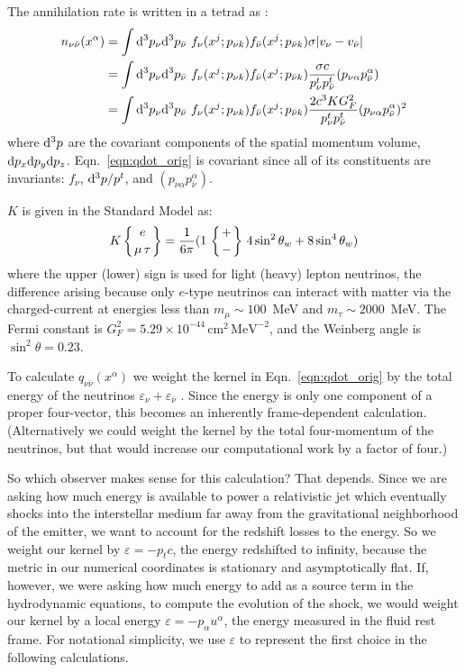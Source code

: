 The annihilation rate is written in a tetrad as \cite{good1987-nunubar}:
\begin{align}
  \label{eqn:qdot_orig}
  n_{\nu \bar{\nu}}(x^\alpha)
  &= \int \mathrm{d}^3p_{\nu} \mathrm{d}^3p_{\bar{\nu}} \,\,
  f_{\nu}(x^j;p_{\nu k})
  f_{\bar{\nu}}(x^j;p_{\bar{\nu} k})
  \sigma |v_\nu-v_{\bar{\nu}}| \nonumber \\
  &= \int \mathrm{d}^3p_\nu \mathrm{d}^3p_{\bar{\nu}} \,\,
  f_{\nu}(x^j;p_{\nu k})
  f_{\bar{\nu}}(x^j;p_{\bar{\nu} k})
  \frac{\sigma c}{p_{\nu}^t p_{\bar{\nu}}^t} (p_{\nu \alpha}  p_{\bar{\nu}}^\alpha) \nonumber \\
  &= \int \mathrm{d}^3p_{\nu} \mathrm{d}^3p_{\bar{\nu}} \,\,
  f_{\nu}(x^j;p_{\nu k})
  f_{\bar{\nu}}(x^j;p_{\bar{\nu} k})
  \frac{2 c^3 K G_F^2}{p_{\nu}^t p_{\bar{\nu}}^t}
  (p_{\nu \alpha} p_{\bar{\nu}}^\alpha)^2
\end{align}
where $\mathrm{d}^3p$ are the covariant components of the spatial momentum volume,
$\mathrm{d} p_x \mathrm{d} p_y \mathrm{d} p_z$.
Eqn.~\ref{eqn:qdot_orig} is covariant since all of its constituents are
invariants: $f_\nu$, $\mathrm{d}^3p/p^t$, and $(p_{\nu \alpha} p_{\bar{\nu}}^\alpha)$.

$K$ is given in the Standard Model as:
\begin{equation}
  K \left\{{e \atop \mu \, \tau}\right\} = \frac{1}{6\pi}
  (1 \, \left\{{+ \atop -}\right\}
  \, 4 \sin^2 \theta_w + 8 \sin^4 \theta_w) \nonumber
\end{equation}
where the upper (lower) sign is used for light (heavy) lepton neutrinos,
the difference arising because only $e$-type neutrinos can interact with
matter via the charged-current at energies less than $m_\mu\sim100$~MeV
and $m_\tau\sim2000$~MeV.
The Fermi constant is $G_F^2 = 5.29 \times 10^{-44}\, \text{cm}^2 \,\text{MeV}^{-2}$,
and the Weinberg angle is $\sin^2 \theta = 0.23$.

To calculate $q_{\nu \bar{\nu}}(x^\alpha)$ we weight the kernel in
Eqn.~\ref{eqn:qdot_orig} by the total energy of the neutrinos
$\varepsilon_{\nu} + \varepsilon_{\bar{\nu}}$
\citep{asan2000-nunubar, salm1999-nunubar}.
Since the energy is only one component of a proper four-vector, this becomes an
inherently frame-dependent calculation.
(Alternatively we could weight the kernel by the total four-momentum of the
neutrinos, but that would increase our computational work by a factor of four.)

So which observer makes sense for this calculation? That depends. Since we are
asking how much energy is available to power a relativistic jet which eventually
shocks into the interstellar medium far away from the gravitational
neighborhood of the emitter, we want to account for
the redshift losses to the energy. So we weight our kernel by
$\varepsilon=-p_t c$, the energy redshifted to infinity, because the metric in
our numerical coordinates is stationary and asymptotically flat.
If, however, we were asking how much energy to add as a source term in the
hydrodynamic equations, to compute the evolution of the shock, we would weight
our kernel by a local energy $\varepsilon=-p_\alpha u^\alpha$, the energy
measured in the fluid rest frame. For notational simplicity, we use
$\varepsilon$ to represent the first choice in the following calculations.

